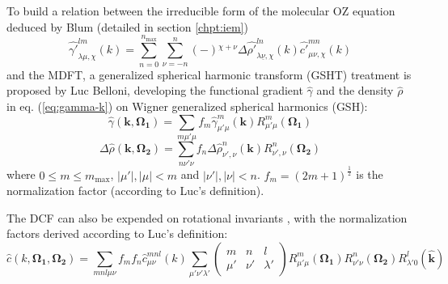 To build a relation between the irreducible form of the molecular
OZ equation deduced by Blum (detailed in section \ref{chpt:iem})
\begin{equation}
\hat{\gamma'}_{\lambda\mu,\chi}^{lm}(k)=\sum_{n=0}^{n_{\mathrm{max}}}\sum_{\nu=-n}^{n}\left(-\right){}^{\chi+\nu}\Delta\hat{\rho'}_{\lambda\underline{\nu},\chi}^{ln}(k)\hat{c'}_{\mu\nu,\chi}^{mn}(k)\label{eq:Blum-reduced-OZ}
\end{equation}
and the MDFT, a generalized spherical harmonic transform (GSHT) treatment
is proposed by Luc Belloni, developing the functional gradient $\hat{\gamma}$
and the density $\hat{\rho}$ in eq. (\ref{eq:gamma-k}) on Wigner
generalized spherical harmonics (GSH):
\begin{equation}
\hat{\gamma}(\mathbf{k},\mathbf{\Omega_{1}})=\sum_{m\mu'\mu}f_{m}\hat{\gamma}_{\mu'\mu}^{m}(\mathbf{k})R_{\mu'\mu}^{m}(\mathbf{\Omega_{1}})\label{eq:gamma-projection}
\end{equation}
\begin{equation}
\Delta\hat{\rho}(\mathbf{k},\mathbf{\Omega_{2}})=\sum_{n\nu'\nu}f_{n}\Delta\hat{\rho}_{\nu',\nu}^{n}(\mathbf{k})R_{\nu',\nu}^{n}(\mathbf{\Omega_{2}})\label{eq:delta-rho-projection}
\end{equation}
where $0\leq m\leq m_{\mathrm{max}}$, $\left|\mu'\right|,\left|\mu\right|<m$
and $\left|\nu'\right|,\left|\nu\right|<n$. $f_{m}=\left(2m+1\right)^{\frac{1}{2}}$
is the normalization factor (according to Luc's definition).

The DCF can also be expended on rotational invariants \citep{Blum_I}, %
with the normalization factors derived according to Luc's definition:
\begin{equation}
\hat{c}(k,\mathbf{\Omega_{1}},\mathbf{\Omega_{2}})=\sum_{mnl\mu\nu}f_{m}f_{n}\hat{c}_{\mu\nu}^{mnl}(k)\sum_{\mu'\nu'\lambda'}\left(\begin{array}{ccc}
m & n & l\\
\mu' & \nu' & \lambda'
\end{array}\right)R_{\mu'\mu}^{m}(\mathbf{\Omega_{1}})R_{\nu'\nu}^{n}(\mathbf{\Omega_{2}})R_{\lambda'0}^{l}(\hat{\mathbf{k}})\label{eq:c-projection}
\end{equation}


